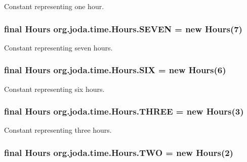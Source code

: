 Constant representing one hour. \hypertarget{classorg_1_1joda_1_1time_1_1_hours_af3f979a2c8d2125e8a8bb6d2044a804d}{
\subsubsection[{S\-E\-V\-E\-N}]{\setlength{\rightskip}{0pt plus 5cm}final {\bf Hours} org.\-joda.\-time.\-Hours.\-S\-E\-V\-E\-N = new {\bf Hours}(7)\hspace{0.3cm}{\ttfamily [static]}}}\label{classorg_1_1joda_1_1time_1_1_hours_af3f979a2c8d2125e8a8bb6d2044a804d}
Constant representing seven hours. \hypertarget{classorg_1_1joda_1_1time_1_1_hours_a821fb554e8abf83218578fa748137c77}{
\subsubsection[{S\-I\-X}]{\setlength{\rightskip}{0pt plus 5cm}final {\bf Hours} org.\-joda.\-time.\-Hours.\-S\-I\-X = new {\bf Hours}(6)\hspace{0.3cm}{\ttfamily [static]}}}\label{classorg_1_1joda_1_1time_1_1_hours_a821fb554e8abf83218578fa748137c77}
Constant representing six hours. \hypertarget{classorg_1_1joda_1_1time_1_1_hours_ac08ca1486d9ebda8fef96100f86f1d1d}{
\subsubsection[{T\-H\-R\-E\-E}]{\setlength{\rightskip}{0pt plus 5cm}final {\bf Hours} org.\-joda.\-time.\-Hours.\-T\-H\-R\-E\-E = new {\bf Hours}(3)\hspace{0.3cm}{\ttfamily [static]}}}\label{classorg_1_1joda_1_1time_1_1_hours_ac08ca1486d9ebda8fef96100f86f1d1d}
Constant representing three hours. \hypertarget{classorg_1_1joda_1_1time_1_1_hours_a2d219dc60d609ab03100c1a623aa0c4b}{
\subsubsection[{T\-W\-O}]{\setlength{\rightskip}{0pt plus 5cm}final {\bf Hours} org.\-joda.\-time.\-Hours.\-T\-W\-O = new {\bf Hours}(2)\hspace{0.3cm}{\ttfamily [static]}}}\label{classorg_1_1joda_1_1time_1_1_hours_a2d219dc60d609ab03100c1a623aa0c4b}
